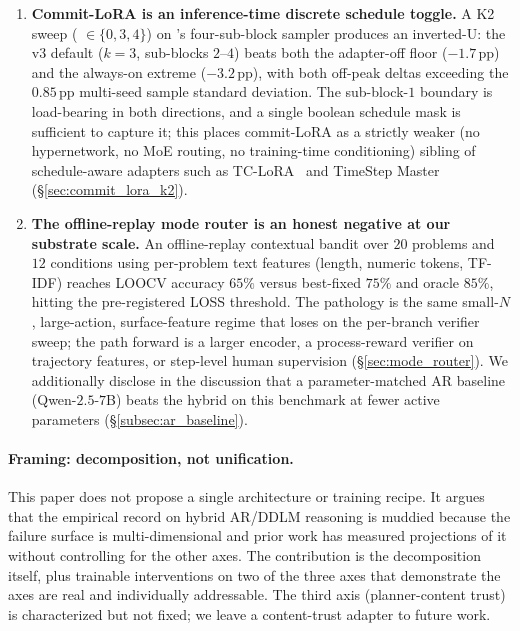 \begin{enumerate}
          verifiers lose, why frontier judges win, and why CoT
          recovers $5$ additional problems
          ($8 \to 13$ of $15$) over the YES/NO prompt
          (\S\ref{sec:voting_gap}).
    \item \textbf{Commit-LoRA is an inference-time discrete
          schedule toggle.}  A K2 sweep
          ( $\in \{0, 3, 4\}$) on
          \LLaDA{}'s four-sub-block sampler produces an
          inverted-U: the v3 default ($k{=}3$, sub-blocks $2$--$4$)
          beats both the adapter-off floor ($-1.7$\,pp) and the
          always-on extreme ($-3.2$\,pp), with both off-peak
          deltas exceeding the $0.85$\,pp multi-seed sample
          standard deviation.  The sub-block-$1$ boundary is
          load-bearing in both directions, and a single boolean
          schedule mask is sufficient to capture it; this places
          commit-LoRA as a strictly weaker (no hypernetwork, no
          MoE routing, no training-time conditioning) sibling of
          schedule-aware adapters such as
          TC-LoRA~\citep{tclora2025} and TimeStep
          Master~\citep{timestepmaster2025}
          (\S\ref{sec:commit_lora_k2}).
    \item \textbf{The offline-replay mode router is an honest
          negative at our substrate scale.}  An offline-replay
          contextual bandit over $20$ problems and $12$ conditions
          using per-problem text features (length, numeric tokens,
          TF-IDF) reaches LOOCV accuracy $65\%$ versus best-fixed
          $75\%$ and oracle $85\%$, hitting the pre-registered
          LOSS threshold.  The pathology is the same small-$N$,
          large-action, surface-feature regime that loses on the
          per-branch verifier sweep; the path forward is a larger
          encoder, a process-reward verifier on trajectory
          features, or step-level human supervision
          (\S\ref{sec:mode_router}).  We additionally disclose in
          the discussion that a parameter-matched AR baseline
          (Qwen-$2.5$-$7$B) beats the hybrid \cmajc{} on this
          benchmark at fewer active parameters
          (\S\ref{subsec:ar_baseline}).
\end{enumerate}

\paragraph{Framing: decomposition, not unification.}
This paper does not propose a single architecture or training recipe.
It argues that the empirical record on hybrid AR/DDLM reasoning is
muddied because the failure surface is multi-dimensional and prior
work has measured projections of it without controlling for the
other axes.  The contribution is the decomposition itself, plus
trainable interventions on two of the three axes that demonstrate
the axes are real and individually addressable.  The third axis
(planner-content trust) is characterized but not fixed; we leave a
content-trust adapter to future work.

